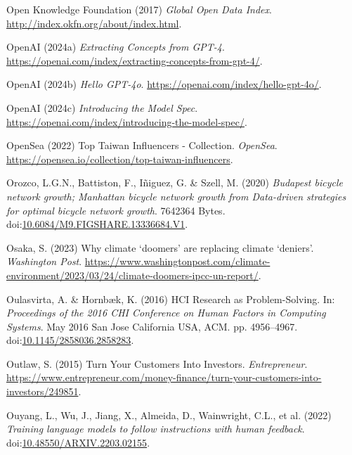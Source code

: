 \documentclass[
  letterpaper,
  DIV=11,
  numbers=noendperiod]{scrartcl}
\newlength{\cslhangindent}
\newenvironment{CSLReferences}[2] %
 {\begin{list}{}{%
  \setlength{\itemindent}{0pt}
  \setlength{\leftmargin}{0pt}
  \setlength{\parsep}{0pt}
  \ifodd #1
   \setlength{\leftmargin}{\cslhangindent}
   \setlength{\itemindent}{-1\cslhangindent}
  \fi
  \setlength{\itemsep}{#2\baselineskip}}}
 {\end{list}}
\begin{document}
\begin{CSLReferences}{0}{1}
Open Knowledge Foundation (2017) \emph{Global {Open Data Index}}.
\url{http://index.okfn.org/about/index.html}.

OpenAI (2024a) \emph{Extracting {Concepts} from {GPT-4}}.
\url{https://openai.com/index/extracting-concepts-from-gpt-4/}.

OpenAI (2024b) \emph{Hello {GPT-4o}}.
\url{https://openai.com/index/hello-gpt-4o/}.

OpenAI (2024c) \emph{Introducing the {Model Spec}}.
\url{https://openai.com/index/introducing-the-model-spec/}.

OpenSea (2022) Top {Taiwan Influencers} - {Collection}. \emph{OpenSea}.
\url{https://opensea.io/collection/top-taiwan-influencers}.

Orozco, L.G.N., Battiston, F., Iñiguez, G. \& Szell, M. (2020)
\emph{Budapest bicycle network growth; {Manhattan} bicycle network
growth from {Data-driven} strategies for optimal bicycle network
growth}. 7642364 Bytes.
doi:\href{https://doi.org/10.6084/M9.FIGSHARE.13336684.V1}{10.6084/M9.FIGSHARE.13336684.V1}.

Osaka, S. (2023) Why climate {`doomers'} are replacing climate
{`deniers'}. \emph{Washington Post}.
\url{https://www.washingtonpost.com/climate-environment/2023/03/24/climate-doomers-ipcc-un-report/}.

Oulasvirta, A. \& Hornbæk, K. (2016) {HCI Research} as
{Problem-Solving}. In: \emph{Proceedings of the 2016 {CHI Conference} on
{Human Factors} in {Computing Systems}}. May 2016 San Jose California
USA, ACM. pp. 4956--4967.
doi:\href{https://doi.org/10.1145/2858036.2858283}{10.1145/2858036.2858283}.

Outlaw, S. (2015) Turn {Your Customers Into Investors}.
\emph{Entrepreneur}.
\url{https://www.entrepreneur.com/money-finance/turn-your-customers-into-investors/249851}.

Ouyang, L., Wu, J., Jiang, X., Almeida, D., Wainwright, C.L., et al.
(2022) \emph{Training language models to follow instructions with human
feedback}.
doi:\href{https://doi.org/10.48550/ARXIV.2203.02155}{10.48550/ARXIV.2203.02155}.


\end{CSLReferences}
\end{document}
